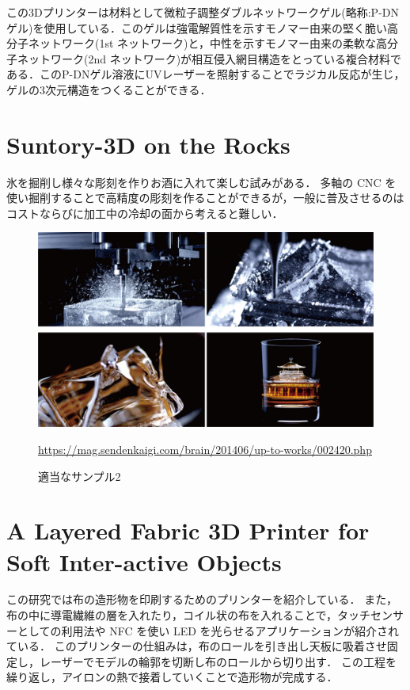 この3Dプリンターは材料として微粒子調整ダブルネットワークゲル(略称:P-DNゲル)を使用している．このゲルは強電解質性を示すモノマー由来の堅く脆い高分子ネットワーク(1st ネットワーク)と，中性を示すモノマー由来の柔軟な高分子ネットワーク(2nd ネットワーク)が相互侵入網目構造をとっている複合材料である．このP-DNゲル溶液にUVレーザーを照射することでラジカル反応が生じ，ゲルの3次元構造をつくることができる．


\section{Suntory-3D on the Rocks}
\label{sec:enum}

氷を掘削し様々な彫刻を作りお酒に入れて楽しむ試みがある．
多軸の CNC を使い掘削することで高精度の彫刻を作ることができるが，一般に普及させるのはコストならびに加工中の冷却の面から考えると難しい．

\begin{figure}[H]
  \centering
  \includegraphics[width=12truecm]{./fig/Suntory.jpg}
  \caption{適当なサンプル2}
  \url{https://mag.sendenkaigi.com/brain/201406/up-to-works/002420.php} %
  \label{fig:Suntory}
\end{figure}


\section{A Layered Fabric 3D Printer for Soft Inter-active Objects}
\label{sec:enum}
この研究では布の造形物を印刷するためのプリンターを紹介している．
また，布の中に導電繊維の層を入れたり，コイル状の布を入れることで，タッチセンサーとしての利用法や NFC を使い LED を光らせるアプリケーションが紹介されている．
このプリンターの仕組みは，布のロールを引き出し天板に吸着させ固定し，レーザーでモデルの輪郭を切断し布のロールから切り出す．
この工程を繰り返し，アイロンの熱で接着していくことで造形物が完成する．

